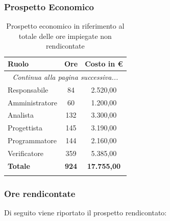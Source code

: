\documentclass[../piano_di_progetto.tex]{subfiles}
\begin{document}
\subsubsection{Prospetto Economico}

\begin{center}
	\begin{longtable}{|l|c|c|}
		\hline
		\rowcolor{lightgray}
		\textbf{Ruolo} & \textbf{Ore} & \textbf{Costo in €}\\
		\hline
		\endhead
		
		\hline
		\multicolumn{3}{|c|}{\emph{Continua alla pagina successiva...}}\\
		\hline
		\endfoot

		\endlastfoot
		
		Responsabile &  84  & 2.520,00\\
		Amministratore &  60  & 1.200,00\\
		Analista &  132  & 3.300,00 \\
		Progettista  & 145 & 3.190,00\\
		Programmatore  & 144 & 2.160,00\\
		Verificatore  & 359 & 5.385,00\\
		\hline
		\textbf{Totale} & \textbf{924} & \textbf{17.755,00}\\
		\hline
		\rowcolor{white}
		\caption{Prospetto economico in riferimento al totale delle ore impiegate non rendicontate}
	\end{longtable}
\end{center}

\subsubsection{Ore rendicontate}
Di seguito viene riportato il prospetto rendicontato:\\
\end{document}
